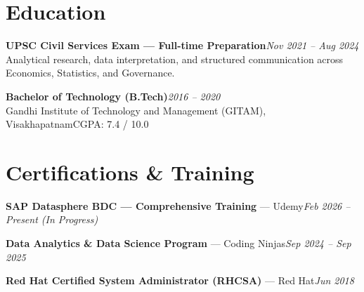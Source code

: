 \documentclass[10pt, letterpaper]{article}
\begin{document}
\section{Education}

{\bfseries UPSC Civil Services Exam — Full-time Preparation}\hfill{\small\color{muted}\textit{Nov 2021 – Aug 2024}}\\
{\small\color{muted}Analytical research, data interpretation, and structured communication across Economics, Statistics, and Governance.}

\vspace{2pt}
{\bfseries Bachelor of Technology (B.Tech)}\hfill{\small\color{muted}\textit{2016 – 2020}}\\
{\small\color{muted}Gandhi Institute of Technology and Management (GITAM), Visakhapatnam\hfill CGPA: 7.4 / 10.0}

\section{Certifications \& Training}

{\bfseries SAP Datasphere BDC — Comprehensive Training} — Udemy\hfill{\small\color{muted}\textit{Feb 2026 – Present \emph{(In Progress)}}}

\vspace{1pt}
{\bfseries Data Analytics \& Data Science Program} — Coding Ninjas\hfill{\small\color{muted}\textit{Sep 2024 – Sep 2025}}

\vspace{1pt}
{\bfseries Red Hat Certified System Administrator (RHCSA)} — Red Hat\hfill{\small\color{muted}\textit{Jun 2018}}

\end{document}
